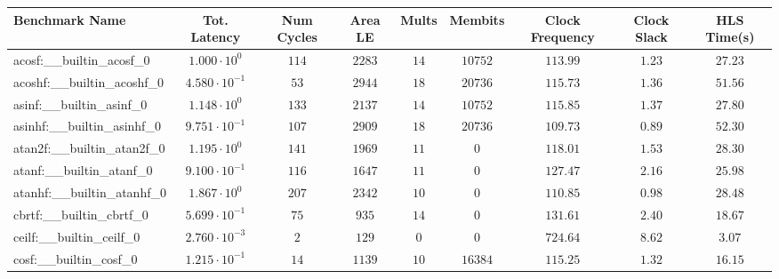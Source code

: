\begin{tabular}{|l|c|c|c|c|c|c|c|c|}
\hline
Benchmark Name                            & Tot. Latency            & Num Cycles & Area LE   & Mults   & Membits    & Clock Frequency & Clock Slack & HLS Time(s) \\
\hline
acosf:\_\_builtin\_acosf\_0               & $ 1.000 \cdot 10^{0}  $ & $ 114    $ & $ 2283  $ & $ 14  $ & $ 10752  $ & $ 113.99      $ & $ 1.23    $ & $ 27.23   $ \\
acoshf:\_\_builtin\_acoshf\_0             & $ 4.580 \cdot 10^{-1} $ & $ 53     $ & $ 2944  $ & $ 18  $ & $ 20736  $ & $ 115.73      $ & $ 1.36    $ & $ 51.56   $ \\
asinf:\_\_builtin\_asinf\_0               & $ 1.148 \cdot 10^{0}  $ & $ 133    $ & $ 2137  $ & $ 14  $ & $ 10752  $ & $ 115.85      $ & $ 1.37    $ & $ 27.80   $ \\
asinhf:\_\_builtin\_asinhf\_0             & $ 9.751 \cdot 10^{-1} $ & $ 107    $ & $ 2909  $ & $ 18  $ & $ 20736  $ & $ 109.73      $ & $ 0.89    $ & $ 52.30   $ \\
atan2f:\_\_builtin\_atan2f\_0             & $ 1.195 \cdot 10^{0}  $ & $ 141    $ & $ 1969  $ & $ 11  $ & $ 0      $ & $ 118.01      $ & $ 1.53    $ & $ 28.30   $ \\
atanf:\_\_builtin\_atanf\_0               & $ 9.100 \cdot 10^{-1} $ & $ 116    $ & $ 1647  $ & $ 11  $ & $ 0      $ & $ 127.47      $ & $ 2.16    $ & $ 25.98   $ \\
atanhf:\_\_builtin\_atanhf\_0             & $ 1.867 \cdot 10^{0}  $ & $ 207    $ & $ 2342  $ & $ 10  $ & $ 0      $ & $ 110.85      $ & $ 0.98    $ & $ 28.48   $ \\
cbrtf:\_\_builtin\_cbrtf\_0               & $ 5.699 \cdot 10^{-1} $ & $ 75     $ & $ 935   $ & $ 14  $ & $ 0      $ & $ 131.61      $ & $ 2.40    $ & $ 18.67   $ \\
ceilf:\_\_builtin\_ceilf\_0               & $ 2.760 \cdot 10^{-3} $ & $ 2      $ & $ 129   $ & $ 0   $ & $ 0      $ & $ 724.64      $ & $ 8.62    $ & $ 3.07    $ \\
cosf:\_\_builtin\_cosf\_0                 & $ 1.215 \cdot 10^{-1} $ & $ 14     $ & $ 1139  $ & $ 10  $ & $ 16384  $ & $ 115.25      $ & $ 1.32    $ & $ 16.15   $ \\

\end{tabular}
